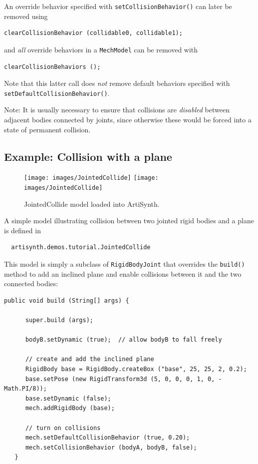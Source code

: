 An override behavior specified with
{\tt setCollisionBehavior()} can later be removed
using 
%
\begin{lstlisting}[]
  clearCollisionBehavior (collidable0, collidable1);
\end{lstlisting}
%
and {\it all} override behaviors in a {\tt MechModel} can
be removed with
%
\begin{lstlisting}[]
  clearCollisionBehaviors ();
\end{lstlisting}
%
Note that this latter call does {\it not} remove default behaviors
specified with {\tt setDefaultCollisionBehavior()}.

\begin{sideblock}
Note: It is usually necessary to ensure that collisions are {\it disabled}
between adjacent bodies connected by joints, since otherwise these
would be forced into a state of permanent collision.
\end{sideblock}

\subsection{Example: Collision with a plane}
\label{JointedCollide:sec}

\begin{figure}[ht]
\begin{center}
\iflatexml
 \texttt{[image: images/JointedCollide]}
\else
 \texttt{[image: images/JointedCollide]}
\fi
\end{center}
\caption{JointedCollide model loaded into ArtiSynth.}
\label{JointedCollide:fig}
\end{figure}

A simple model illustrating collision between two jointed rigid bodies
and a plane is defined in
%
\begin{verbatim}
  artisynth.demos.tutorial.JointedCollide
\end{verbatim}
%

This model is simply a subclass of {\tt RigidBodyJoint} that
overrides the {\tt build()} method 
to add an inclined plane and enable collisions between it and
the two connected bodies:
%
\lstset{numbers=left}
\begin{lstlisting}[]
   public void build (String[] args) {

      super.build (args);

      bodyB.setDynamic (true);  // allow bodyB to fall freely

      // create and add the inclined plane
      RigidBody base = RigidBody.createBox ("base", 25, 25, 2, 0.2);
      base.setPose (new RigidTransform3d (5, 0, 0, 0, 1, 0, -Math.PI/8));
      base.setDynamic (false);
      mech.addRigidBody (base);

      // turn on collisions
      mech.setDefaultCollisionBehavior (true, 0.20);
      mech.setCollisionBehavior (bodyA, bodyB, false);
   }
\end{lstlisting}
\lstset{numbers=none}

